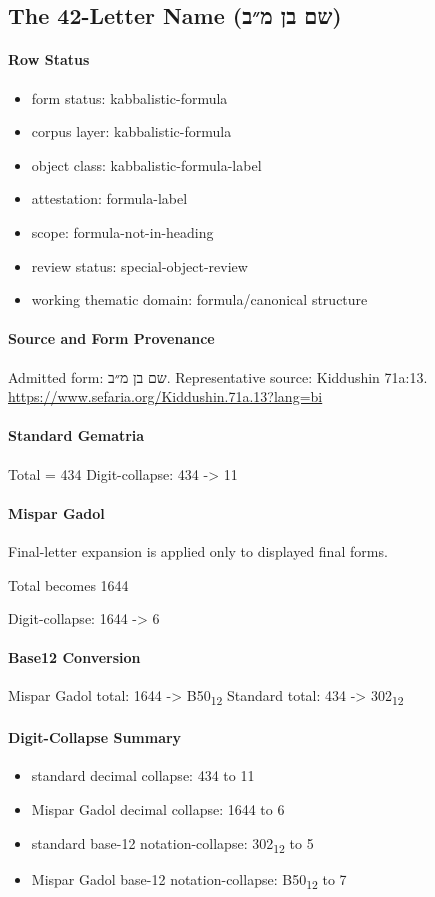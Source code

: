 \subsection{The 42-Letter Name (שם בן מ״ב)}
\paragraph{Row Status}
\begin{itemize}
\item form status: kabbalistic-formula
\item corpus layer: kabbalistic-formula
\item object class: kabbalistic-formula-label
\item attestation: formula-label
\item scope: formula-not-in-heading
\item review status: special-object-review
\item working thematic domain: formula/canonical structure
\end{itemize}
\paragraph{Source and Form Provenance}
Admitted form: שם בן מ״ב.
Representative source: Kiddushin 71a:13.
\url{https://www.sefaria.org/Kiddushin.71a.13?lang=bi}
\paragraph{Standard Gematria}
Total = 434
Digit-collapse: 434 -> 11
\paragraph{Mispar Gadol}
Final-letter expansion is applied only to displayed final forms.

Total becomes 1644

Digit-collapse: 1644 -> 6
\paragraph{Base12 Conversion}
Mispar Gadol total: 1644 -> B50\textsubscript{12}
Standard total: 434 -> 302\textsubscript{12}
\paragraph{Digit-Collapse Summary}
\begin{itemize}
\item standard decimal collapse: 434 to 11
\item Mispar Gadol decimal collapse: 1644 to 6
\item standard base-12 notation-collapse: 302\textsubscript{12} to 5
\item Mispar Gadol base-12 notation-collapse: B50\textsubscript{12} to 7
\end{itemize}
